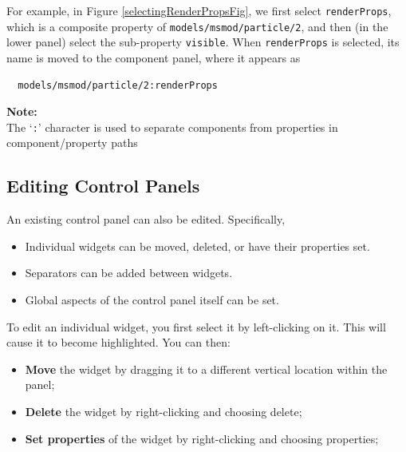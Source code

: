 \documentclass{article}
\begin{document}
For example, in Figure \ref{selectingRenderPropsFig}, we first select
{\tt renderProps}, which is a composite property of
{\tt models/msmod/particle/2}, and then (in the lower panel) select the
sub-property {\tt visible}.  When {\tt renderProps} is selected, its name is
moved to the component panel, where it appears as

\begin{verbatim}
  models/msmod/particle/2:renderProps
\end{verbatim}

\begin{sideblock}
{\bf Note:}\\ 
The `{\tt :}' character is used to separate components from
properties in component/property paths
\end{sideblock}

\subsection{Editing Control Panels}

An existing control panel can also be edited. Specifically,

\begin{itemize}

\item Individual widgets can be moved, deleted, or have their properties
set.

\item Separators can be added between widgets.

\item Global aspects of the control panel itself can be set.

\end{itemize}

To edit an individual widget, you first select it by left-clicking on
it. This will cause it to become highlighted. You can then:

\begin{itemize}

\item {\bf Move} the widget by dragging it to a different vertical location
within the panel;

\item {\bf Delete} the widget by right-clicking and choosing {\sf delete};

\item {\bf Set properties} of the widget by right-clicking and choosing
{\sf properties};

\end{itemize}
\end{document}
